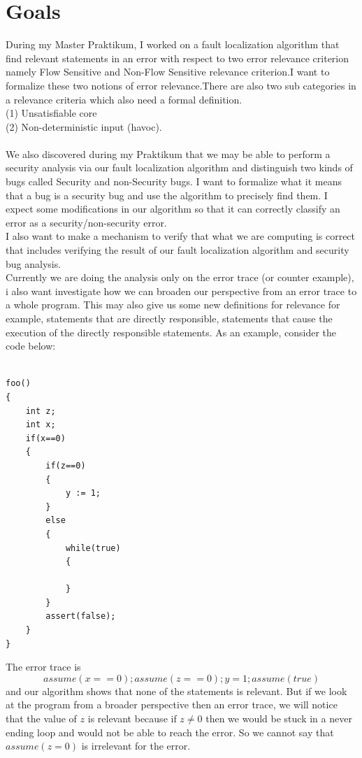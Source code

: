 \documentclass{article}
\begin{document}
\section{Goals}
During my Master Praktikum, I worked on a fault localization algorithm that find relevant statements in an error with respect to two error relevance criterion namely Flow Sensitive and Non-Flow Sensitive relevance criterion.I want to formalize these two notions of error relevance.There are also two sub categories in a relevance criteria which also need a formal definition. \\(1) Unsatisfiable core\\ (2) Non-deterministic input (havoc). \\
\\We also discovered during my Praktikum that we may be able to perform a security analysis via our fault localization algorithm and distinguish two kinds of bugs called Security and non-Security bugs. I want to formalize what it means that a bug is a security bug and use the algorithm to precisely find them. I expect some modifications in our algorithm so that it can correctly classify an error as a security/non-security error.\\
I also want to make a mechanism to verify that what we are computing is correct that includes verifying the result of our fault localization algorithm and security bug analysis.\\
Currently we are doing the analysis only on the error trace (or counter example), i also want investigate how we can broaden our perspective from an error trace to a whole program. This may also give us some new definitions for relevance for example, statements that are directly responsible, statements that cause the execution of the directly responsible statements. As an example, consider the code below:\\
\begin{lstlisting}

foo()
{
	int z;
	int x;
	if(x==0)
	{
		if(z==0)
		{
			y := 1;
		}
		else
		{
			while(true)
			{
				
			}
		}		
		assert(false);
	}	
}

\end{lstlisting}
The error trace is
$$ assume(x==0); assume(z==0); y=1; assume(true) $$
and our algorithm shows that none of the statements is relevant. But if we look at the program from a broader perspective then an error trace, we will notice that the value of  $z$ is relevant because if $z \neq 0$ then we would be stuck in a never ending loop and would not be able to reach the error.  
So we cannot say that $assume(z=0)$ is irrelevant for the error.
\end{document}
